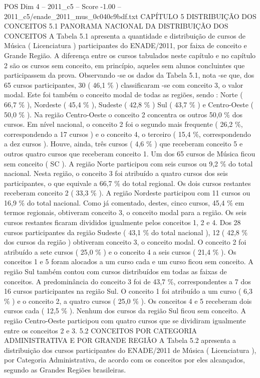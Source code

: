 \begin{textsample}{POS Dim 4 – 2011\_c5 – Score -1.00 – 2011\_c5/enade\_2011\_mus\_0c040c9bdf.txt}  \label{ex:f4_pos_248}
CAPÍTULO 5 DISTRIBUIÇÃO DOS CONCEITOS 5.1 PANORAMA NACIONAL DA DISTRIBUIÇÃO DOS CONCEITOS A Tabela 5.1 apresenta a quantidade e distribuição de cursos de Música ( Licenciatura ) participantes do ENADE/2011, por faixa de conceito e Grande Região.
A diferença entre os cursos tabulados neste capítulo e no capítulo 2 são os cursos sem conceito, em princípio, aqueles sem alunos concluintes que participassem da prova.
Observando -se os dados da Tabela 5.1, nota -se que, dos 65 cursos participantes, 30 ( 46,1 \% ) classificaram -se com conceito 3, o valor modal.
Este foi também o conceito modal de todas as regiões, sendo : Norte ( 66,7 \% ), Nordeste ( 45,4 \% ), Sudeste ( 42,8 \% ) Sul ( 43,7 \% ) e Centro-Oeste ( 50,0 \% ).
Na região Centro-Oeste o conceito 2 concentra os outros 50,0 \% dos cursos.
Em nível nacional, o conceito 2 foi o segundo mais frequente ( 26,2 \%, correspondendo a 17 cursos ) e o conceito 4, o terceiro ( 15,4 \%, correspondendo a dez cursos ).
Houve, ainda, três cursos ( 4,6 \% ) que receberam conceito 5 e outros quatro cursos que receberam conceito 1.
Um dos 65 cursos de Música ficou sem conceito ( SC ).
A região Norte participou com seis cursos ou 9,2 \% do total nacional.
Nesta região, o conceito 3 foi atribuído a quatro cursos dos seis participantes, o que equivale a 66,7 \% do total regional.
Os dois cursos restantes receberam conceito 2 ( 33,3 \% ).
A região Nordeste participou com 11 cursos ou 16,9 \% do total nacional.
Como já comentado, destes, cinco cursos, 45,4 \% em termos regionais, obtiveram conceito 3, o conceito modal para a região.
Os seis cursos restantes ficaram divididos igualmente pelos conceitos 1, 2 e 4.
Dos 28 cursos participantes da região Sudeste ( 43,1 \% do total nacional ), 12 ( 42,8 \% dos cursos da região ) obtiveram conceito 3, o conceito modal.
O conceito 2 foi atribuído a sete cursos ( 25,0 \% ) e o conceito 4 a seis cursos ( 21,4 \% ).
Os conceitos 1 e 5 foram alocados a um curso cada e um curso ficou sem conceito.
A região Sul também contou com cursos distribuídos em todas as faixas de conceitos.
A predominância do conceito 3 foi de 43,7 \%, correspondentes a 7 dos 16 cursos participantes na região Sul.
O conceito 1 foi atribuído a um curso ( 6,3 \% ) e o conceito 2, a quatro cursos ( 25,0 \% ).
Os conceitos 4 e 5 receberam dois cursos cada ( 12,5 \% ).
Nenhum dos cursos da região Sul ficou sem conceito.
A região Centro-Oeste participou com quatro cursos que se dividiram igualmente entre os conceitos 2 e 3. 5.2 CONCEITOS POR CATEGORIA ADMINISTRATIVA E POR GRANDE REGIÃO A Tabela 5.2 apresenta a distribuição dos cursos participantes do ENADE/2011 de Música ( Licenciatura ), por Categoria Administrativa, de acordo com os conceitos por eles alcançados, segundo as Grandes Regiões brasileiras.

\end{textsample}

